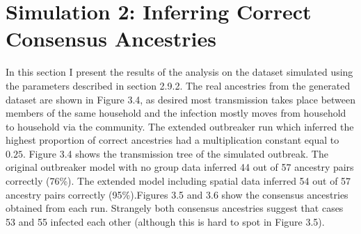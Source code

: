 \documentclass[11pt,a4paper]{report}
\begin{document}
\section{Simulation 2: Inferring Correct Consensus Ancestries}
In this section I present the results of the analysis on the dataset simulated using the parameters described in section 2.9.2. The real ancestries from the generated dataset are shown in Figure 3.4, as desired most transmission takes place between members of the same household and the infection mostly moves from household to household via the community. The extended outbreaker run which inferred the highest proportion of correct ancestries had a multiplication constant equal to $0.25$. Figure 3.4 shows the transmission tree of the simulated outbreak. The original outbreaker model with no group data inferred 44 out of 57 ancestry pairs correctly (76\%). The extended model including spatial data inferred 54 out of 57 ancestry pairs correctly (95\%).Figures 3.5 and 3.6 show the consensus ancestries obtained from each run. Strangely both consensus ancestries suggest that cases 53 and 55 infected each other (although this is hard to spot in Figure 3.5).
\end{document}
